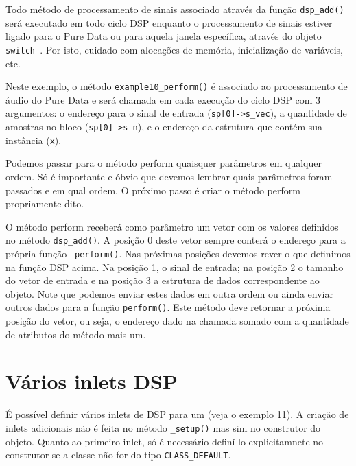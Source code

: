 Todo método de processamento de sinais associado através da função
\texttt{dsp\_add()} será executado em todo ciclo DSP enquanto o processamento
de sinais estiver ligado para o Pure Data ou para aquela janela específica,
através do objeto \texttt{switch~}. Por isto, cuidado com alocações de
memória, inicialização de variáveis, etc.

Neste exemplo, o método \texttt{example10\_perform()} é associado ao
processamento de áudio do Pure Data e será chamada em cada execução do ciclo
DSP com 3 argumentos: o endereço para o sinal de entrada
(\texttt{sp[0]->s\_vec}), a quantidade de amostras no bloco
(\texttt{sp[0]->s\_n}), e o endereço da estrutura que contém sua instância
(\texttt{x}).

Podemos passar para o método perform quaisquer parâmetros em qualquer ordem.
Só é importante e óbvio que devemos lembrar quais parâmetros foram passados e
em qual ordem. O próximo passo é criar o método perform propriamente dito.




O método perform receberá como parâmetro um vetor com os valores definidos no
método \texttt{dsp\_add()}. A posição 0 deste vetor sempre conterá o endereço
para a própria função \texttt{\_perform()}. Nas próximas posições devemos rever
o que definimos na função DSP acima. Na posição 1, o sinal de entrada;
na posição 2 o tamanho do vetor de entrada e na posição 3 a estrutura de dados
correspondente ao objeto. Note que podemos enviar estes dados em outra ordem ou
ainda enviar outros dados para a função \texttt{perform()}.
Este método deve retornar a próxima posição do vetor, ou seja, o endereço dado 
na chamada somado com a quantidade de atributos do método mais um.

\section{Vários inlets DSP}

É possível definir vários inlets de DSP para um \external (veja o exemplo 11).
A criação de inlets adicionais não é feita no método \texttt{\_setup()} mas
sim no construtor do objeto. Quanto ao primeiro inlet, só é necessário
definí-lo explicitamnete no construtor se a classe não for do tipo
\texttt{CLASS\_DEFAULT}.

